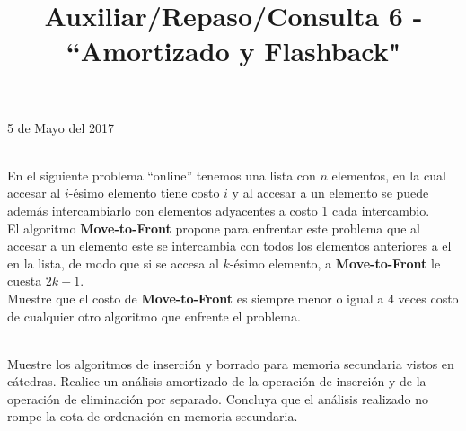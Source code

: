 \documentclass[dcc,uchile]{fcfmcourse}
\title{Auxiliar/Repaso/Consulta 6 - ``Amortizado y Flashback"}
\begin{document}
\maketitle
\begin{center}
5 de Mayo del 2017
\end{center}
\vspace{-1ex}


\begin{problems}
\\
En el siguiente problema ``online'' tenemos una lista con $n$ elementos, en la cual accesar al $i$-ésimo elemento tiene costo $i$ y al accesar a un elemento se puede además intercambiarlo con elementos adyacentes a costo 1 cada intercambio.\\
El algoritmo \textbf{Move-to-Front} propone para enfrentar este problema que al accesar a un elemento este se intercambia con todos los elementos anteriores a el en la lista, de modo que si se accesa al $k$-ésimo elemento, a \textbf{Move-to-Front} le cuesta $2k-1$.\\
Muestre que el costo de \textbf{Move-to-Front} es siempre menor o igual a 4 veces costo de cualquier otro algoritmo que enfrente el problema.

\\
Muestre los algoritmos de inserción y borrado para memoria secundaria vistos en cátedras. Realice un análisis amortizado de la operación de inserción y de la operación de eliminación por separado. Concluya que el análisis realizado no rompe la cota de ordenación en memoria secundaria.

\end{problems}
\end{document}
